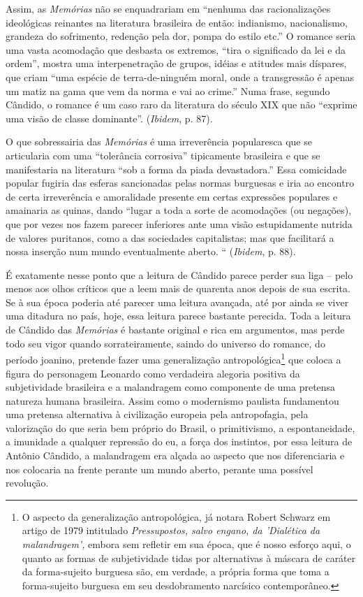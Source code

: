 Assim, as \emph{Memórias} não se enquadrariam em ``nenhuma das
racionalizações ideológicas reinantes na literatura brasileira de então:
indianismo, nacionalismo, grandeza do sofrimento, redenção pela dor,
pompa do estilo etc.'' O romance seria uma vasta acomodação que desbasta
os extremos, ``tira o significado da lei e da ordem'', mostra uma
interpenetração de grupos, idéias e atitudes mais díspares, que criam
``uma espécie de terra-de-ninguém moral, onde a transgressão é apenas um
matiz na gama que vem da norma e vai ao crime.'' Numa frase, segundo
Cândido, o romance é um caso raro da literatura do século XIX que não
``exprime uma visão de classe dominante''. (\emph{Ibidem}, p. 87).

O que sobressairia das \emph{Memórias} é uma irreverência popularesca
que se articularia com uma ``tolerância corrosiva'' tipicamente
brasileira e que se manifestaria na literatura ``sob a forma da piada
devastadora.'' Essa comicidade popular fugiria das esferas sancionadas
pelas normas burguesas e iria ao encontro de certa irreverência e
amoralidade presente em certas expressões populares e amainaria as
quinas, dando ``lugar a toda a sorte de acomodações (ou negações), que
por vezes nos fazem parecer inferiores ante uma visão estupidamente
nutrida de valores puritanos, como a das sociedades capitalistas; mas
que facilitará a nossa inserção num mundo eventualmente aberto. ``
(\emph{Ibidem}, p. 88).

É exatamente nesse ponto que a leitura de Cândido parece perder sua liga
-- pelo menos aos olhos críticos que a leem mais de quarenta anos depois
de sua escrita. Se à sua época poderia até parecer uma leitura avançada,
até por ainda se viver uma ditadura no país, hoje, essa leitura parece
bastante perecida. Toda a leitura de Cândido das \emph{Memórias} é
bastante original e rica em argumentos, mas perde todo seu vigor quando
sorrateiramente, saindo do universo do romance, do período joanino,
pretende fazer uma generalização antropológica\footnote{O aspecto da
  generalização antropológica, já notara Robert Schwarz em artigo de
  1979 intitulado \emph{Pressupostos, salvo engano, da 'Dialética da
  malandragem',} embora sem refletir em sua época, que é nosso esforço
  aqui, o quanto as formas de subjetividade tidas por alternativas à
  máscara de caráter da forma-sujeito burguesa são, em verdade, a
  própria forma que toma a forma-sujeito burguesa em seu desdobramento
  narcísico contemporâneo.} que coloca a figura do personagem Leonardo
como verdadeira alegoria positiva da subjetividade brasileira e a
malandragem como componente de uma pretensa natureza humana brasileira.
Assim como o modernismo paulista fundamentou uma pretensa alternativa à
civilização europeia pela antropofagia, pela valorização do que seria
bem próprio do Brasil, o primitivismo, a espontaneidade, a imunidade a
qualquer repressão do eu, a força dos instintos, por essa leitura de
Antônio Cândido, a malandragem era alçada ao aspecto que nos
diferenciaria e nos colocaria na frente perante um mundo aberto, perante
uma possível revolução.


